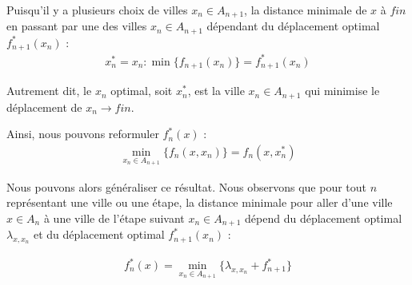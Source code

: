 \documentclass{report}
\begin{document}
\begin{multicols*}{2}
Puisqu'il y a plusieurs choix de villes $x_n \in A_{n+1}$, la distance minimale 
de $x$ à $fin$ en passant par une des villes $x_n \in A_{n+1}$ dépendant du déplacement 
optimal $f_{n+1}^{*}(x_n)$ :
\begin{align*}
    x_n^{*} = x_n : \min\bigl\{ f_{n+1}(x_n) \bigr\} = f_{n+1}^{*}(x_n)
\end{align*}

Autrement dit, le $x_n$ optimal,  soit $x_n^{*}$, est la ville 
$x_n \in A_{n+1}$
qui minimise le déplacement de $x_n \rightarrow fin$. 


Ainsi, nous pouvons reformuler $f_n^{*}(x)$ : 
\begin{align*}
    \min_{x_n \in A_{n+1}}\bigl\{ f_n(x, x_n) \bigr\} = f_n(x, x^{*}_n)
\end{align*}


Nous pouvons alors généraliser ce résultat. Nous observons que pour 
tout $n$ représentant une ville ou une étape,  
la distance minimale pour aller d'une ville $x \in A_n$ à 
une ville de l'étape suivant $x_n \in A_{n+1}$ dépend 
du déplacement optimal $\lambda_{x, x_n}$ et du 
déplacement optimal $f_{n+1}^{*}(x_n)$ :

\begin{align*}
    \boxed{
    f_n^{*}(x) = \min_{x_n \in A_{n+1}} \bigl\{\lambda_{x, x_n} 
        + 
    f_{n+1}^{*} \bigr\}
}
\end{align*}





\end{multicols*}
\end{document}
